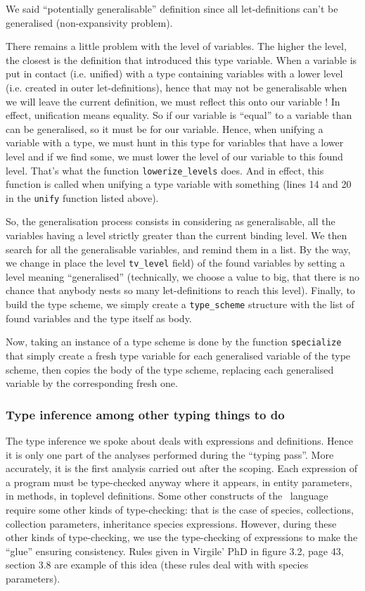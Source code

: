 We said ``potentially generalisable'' definition since all
let-definitions can't be generalised (non-expansivity problem).

There remains a little problem with the level of variables. The higher
the level, the closest is the definition that introduced this type
variable. When a variable is put in contact (i.e. unified) with a type
containing variables with a lower level (i.e. created in outer
let-definitions), hence that may not be generalisable when we will
leave the current definition, we must reflect this onto our variable !
In effect, unification means equality. So if our variable is ``equal''
to a variable than can be generalised, so it must be for our
variable. Hence, when unifying a variable with a type, we must hunt in
this type for variables that have a lower level and if we find some,
we must lower the level of our variable to this found level. That's
what the function {\tt lowerize\_levels} does. And in effect, this
function is called when unifying a type variable with something (lines 
14 and 20 in the {\tt unify} function listed above).


\medskip
So, the generalisation process consists in considering as
generalisable, all the variables having a level strictly greater than
the current binding level. We then search for all the generalisable
variables, and remind them in a list. By the way, we change in place
the level {\tt tv\_level} field) of the found variables by setting a
level meaning ``generalised'' (technically, we choose a value to big,
that there is no chance that anybody nests so many let-definitions to
reach this level). Finally, to build the type scheme, we simply
create a {\tt type\_scheme} structure with the list of found variables
and the type itself as body.

\medskip
Now, taking an instance of a type scheme is done by the function
{\tt specialize} that simply create a fresh type variable for each
generalised variable of the type scheme, then copies the body of the
type scheme, replacing each generalised variable by the corresponding
fresh one.


\subsubsection{Type inference among other typing things to do}
The type inference we spoke about deals with expressions and
definitions. Hence it is only one part of the analyses performed
during the ``typing pass''. More accurately, it is the first analysis
carried out after the scoping. Each expression of a program must be
type-checked anyway where it appears, in entity parameters, in
methods, in toplevel definitions. Some other constructs of the
\focalize\ language require some other kinds of type-checking: that is
the case of species, collections, collection parameters, inheritance
species expressions. However, during these other kinds of
type-checking, we use the type-checking of expressions to make the
``glue'' ensuring consistency. Rules given in Virgile' PhD in figure
3.2, page 43, section 3.8 are example of this idea (these rules deal
with with species parameters).

